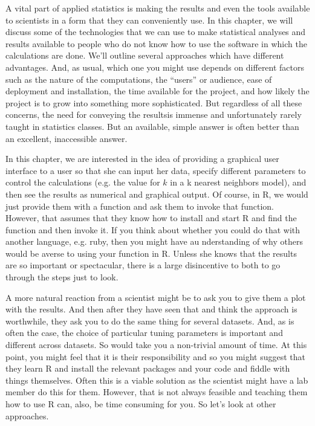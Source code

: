 A vital part of applied statistics is making the results and even the
tools available to scientists in a form that they can conveniently
use.  In this chapter, we will discuss some of the technologies that
we can use to make statistical analyses and results available to
people who do not know how to use the software in which the
calculations are done.  We'll outline several approaches which have
different advantages.  And, as usual, which one you might use depends
on different factors such as the nature of the computations, the
``users'' or audience, ease of deployment and installation, the time
available for the project, and how likely the project is to grow into
something more sophisticated.  But regardless of all these concerns,
the need for conveying the resultsis immense and unfortunately rarely
taught in statistics classes.  But an available, simple answer is
often better than an excellent, inaccessible answer.

In this chapter, we are interested in the idea of providing a
graphical user interface to a user so that she can input her data,
specify different parameters to control the calculations (e.g. the
value for $k$ in a k nearest neighbors model), and then see the
results as numerical and graphical output.  Of course, in R, we would
just provide them with a function and ask them to invoke that
function.  However, that assumes that they know how to install and
start R and find the function and then invoke it.  If you think about
whether you could do that with another language, e.g. ruby, then you
might have au nderstanding of why others would be averse to using your
function in R.  Unless she knows that the results are so important or
spectacular, there is a large disincentive to both to go through the
steps just to look.

A more natural reaction from a scientist might be to ask you to give
them a plot with the results.  And then after they have seen that and
think the approach is worthwhile, they ask you to do the same thing
for several datasets.  And, as is often the case, the choice of
particular tuning parameters is important and different across
datasets.  So would take you a non-trivial amount of time.  At this
point, you might feel that it is their responsibility and so you might
suggest that they learn R and install the relevant packages and your
code and fiddle with things themselves.  Often this is a viable
solution as the scientist might have a lab member do this for them.
However, that is not always feasible and teaching them how to use R
can, also, be time consuming for you.  So let's look at other
approaches.

